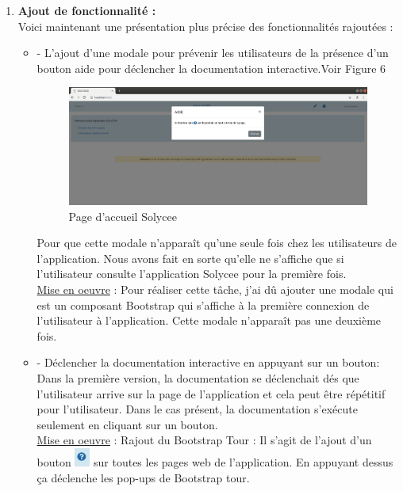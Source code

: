 \documentclass[12pt]{article}
\begin{document}
\begin{enumerate}
\item \textbf{Ajout de fonctionnalité :}\\
Voici maintenant une présentation plus précise des fonctionnalités rajoutées : 

\begin{itemize}
\item - L'ajout d'une modale pour prévenir les utilisateurs de la présence d'un bouton aide pour déclencher la documentation interactive.Voir Figure 6

\begin{figure}[H]
	\centering
 		\includegraphics[width=1\textwidth]{diagrammes/aide_modal.png}
  		\caption{Page d'accueil Solycee}
	\end{figure}
Pour que cette modale n'apparaît qu'une seule fois chez les utilisateurs de l'application. Nous avons fait en sorte qu'elle ne s'affiche que si l'utilisateur consulte l'application Solycee pour la première fois. \\ 


\underline{Mise en oeuvre} :
Pour réaliser cette tâche, j'ai dû ajouter une modale qui est un composant Bootstrap qui s'affiche à la première connexion de l'utilisateur à l'application. Cette modale n'apparaît pas une deuxième fois. \\ 

   
\item - Déclencher la documentation interactive en appuyant sur un bouton: Dans la première version, la documentation se déclenchait dés que l'utilisateur arrive sur la page de l'application et cela peut être répétitif pour l'utilisateur. Dans le cas présent, la documentation s'exécute seulement en cliquant sur un bouton. \\ 

\underline{Mise en oeuvre} :
Rajout du Bootstrap Tour : Il s'agit de l'ajout d'un bouton \includegraphics[width=5mm,scale=0.5]{diagrammes/Bouton_aideDispo.png} sur toutes les pages web de l'application. En appuyant dessus ça déclenche les pop-ups  de Bootstrap tour. 



\end{itemize}
\end{enumerate}
\end{document}
